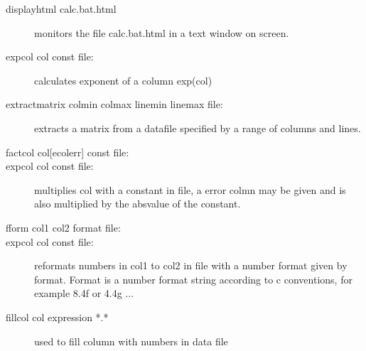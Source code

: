\begin{description}
\item [\prg displayhtml\label{displayhtml} calc.bat.html] monitors the file calc.bat.html in 
a text window on screen.
\item [\prg expcol\label{expcol} col const file:] calculates exponent of a column exp(col) 
\item [\prg extractmatrix\label{extractmatrix} colmin colmax linemin linemax file:]
 extracts a matrix from a datafile specified by a range of columns and lines.
\item [\prg factcol\label{factcol} col{[ecolerr]} const file:]\item [\prg expcol col const file:]
 multiplies col with a constant in file,
a error colmn may be given and is also multiplied by the absvalue of the constant.
\item [\prg fform\label{fform} col1 col2 format file:]\item [\prg expcol col const file:]
 reformats numbers in col1 to col2 in file %
with
             a number format given by format. Format is a number format string according
             to c conventions, for example 8.4f or 4.4g  ...             
\item [\prg fillcol  col expression *.*\label{fillcol}]  used to fill column with numbers in data file

\end{description}
